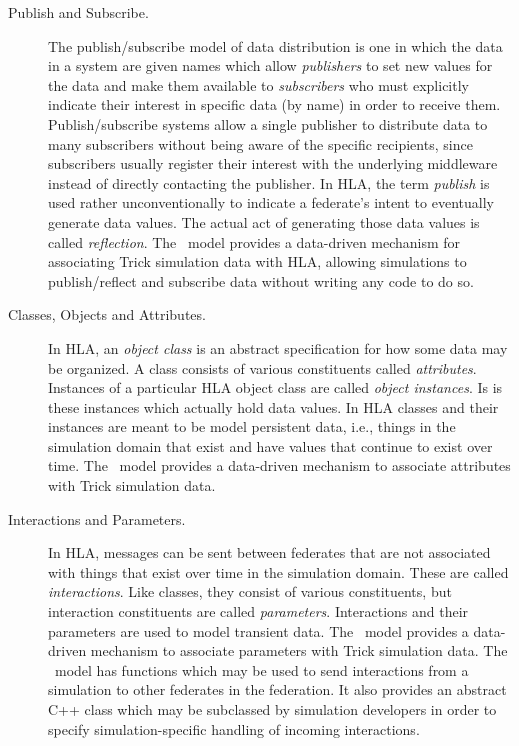 \begin{description}
\item[Publish and Subscribe.]
The publish/subscribe model of data distribution is one in which
the data in a system are given names which allow {\em publishers} to
set new values for the data and make them available to {\em subscribers}
who must explicitly indicate their interest in specific data (by name)
in order to receive them.
Publish/subscribe systems allow a single publisher to distribute
data to many subscribers without being aware of the specific recipients, 
since subscribers usually register their interest with the underlying 
middleware instead of directly contacting the publisher.
In HLA, the term {\em publish} is used rather unconventionally to indicate
a federate's intent to eventually generate data values. 
The actual act of generating those data values is called {\em reflection}.
The \TrickHLA\ model provides a data-driven mechanism for associating
Trick simulation data with HLA,
allowing simulations to publish/reflect and subscribe data without writing
any code to do so.

\item[Classes, Objects and Attributes.]
In HLA, an {\em object class} is an abstract specification for how some data may
be organized. 
A class consists of various constituents called {\em attributes}.
Instances of a particular HLA object class are called {\em object instances}.
Is is these instances which actually hold data values.
In HLA classes and their instances are meant to be model persistent data,
i.e., things in the simulation domain that exist and have values that continue
to exist over time.
The \TrickHLA\ model provides a data-driven mechanism to associate attributes 
with Trick simulation data.

\item[Interactions and Parameters.]
In HLA, messages can be sent between federates that are not associated with things
that exist over time in the simulation domain.
These are called {\em interactions}.
Like classes, they consist of various constituents, but interaction constituents
are called {\em parameters}.
Interactions and their parameters are used to model transient data.
The \TrickHLA\ model provides a data-driven mechanism to associate parameters 
with Trick simulation data.
The \TrickHLA\ model has functions which may be used to send interactions from
a simulation to other federates in the federation.
It also provides an abstract C++ class which may be subclassed by simulation
developers in order to specify simulation-specific handling of incoming interactions.


\end{description}
